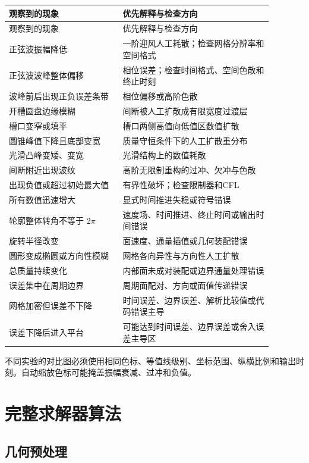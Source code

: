 \documentclass[UTF8,12pt,a4paper,fontset=fandol]{ctexart}
\numberwithin{equation}{section}
\begin{document}
\begin{longtable}{L{0.38\linewidth}L{0.50\linewidth}}
\toprule
观察到的现象 & 优先解释与检查方向\\
\midrule
\endfirsthead
\toprule
观察到的现象 & 优先解释与检查方向\\
\midrule
\endhead
正弦波振幅降低 & 一阶迎风人工耗散；检查网格分辨率和空间格式\\
正弦波波峰整体偏移 & 相位误差；检查时间格式、空间色散和终止时刻\\
波峰前后出现正负误差条带 & 相位偏移或高阶色散\\
开槽圆盘边缘模糊 & 间断被人工扩散成有限宽度过渡层\\
槽口变窄或填平 & 槽口两侧高值向低值区数值扩散\\
圆锥峰值下降且底部变宽 & 质量守恒条件下的人工扩散重分布\\
光滑凸峰变矮、变宽 & 光滑结构上的数值耗散\\
间断附近出现波纹 & 高阶无限制重构的过冲、欠冲与色散\\
出现负值或超过初始最大值 & 有界性破坏；检查限制器和CFL\\
所有数值迅速增大 & 显式时间推进失稳或符号错误\\
轮廓整体转角不等于 $2\pi$ & 速度场、时间推进、终止时间或输出时间错误\\
旋转半径改变 & 面速度、通量插值或几何装配错误\\
圆形变成椭圆或方向性模糊 & 网格各向异性与方向性人工扩散\\
总质量持续变化 & 内部面未成对装配或边界通量处理错误\\
误差集中在周期边界 & 周期面配对、方向或面值传递错误\\
网格加密但误差不下降 & 时间误差、边界误差、解析比较值或代码错误主导\\
误差下降后进入平台 & 可能达到时间误差、边界误差或舍入误差主导区\\
\bottomrule
\end{longtable}

不同实验的对比图必须使用相同色标、等值线级别、坐标范围、纵横比例和输出时刻。自动缩放色标可能掩盖振幅衰减、过冲和负值。

\section{完整求解器算法}

\subsection{几何预处理}
\end{document}
